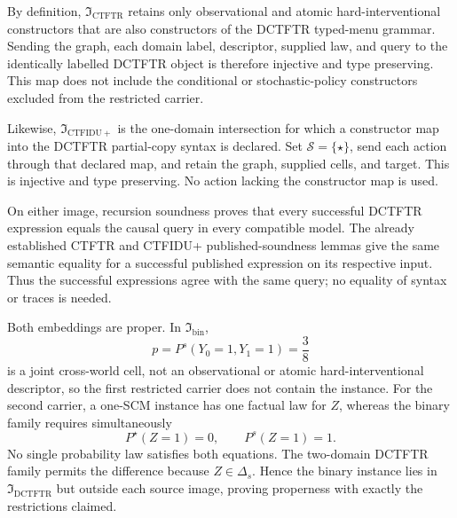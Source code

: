 By definition, \(\mathfrak I_{\mathrm{CTFTR}}\) retains only observational and atomic hard-interventional constructors that are also constructors of the DCTFTR typed-menu grammar. Sending the graph, each domain label, descriptor, supplied law, and query to the identically labelled DCTFTR object is therefore injective and type preserving. This map does not include the conditional or stochastic-policy constructors excluded from the restricted carrier.

Likewise, \(\mathfrak I_{\mathrm{CTFIDU+}}\) is the one-domain intersection for which a constructor map into the DCTFTR partial-copy syntax is declared. Set \(\mathcal S=\{\star\}\), send each action through that declared map, and retain the graph, supplied cells, and target. This is injective and type preserving. No action lacking the constructor map is used.

On either image, recursion soundness proves that every successful DCTFTR expression equals the causal query in every compatible model. The already established CTFTR and CTFIDU+ published-soundness lemmas give the same semantic equality for a successful published expression on its respective input. Thus the successful expressions agree with the same query; no equality of syntax or traces is needed.

Both embeddings are proper. In \(\mathfrak I_{\mathrm{bin}}\),
\[
p=P^s(Y_0=1,Y_1=1)=\frac38
\]
is a joint cross-world cell, not an observational or atomic hard-interventional descriptor, so the first restricted carrier does not contain the instance. For the second carrier, a one-SCM instance has one factual law for \(Z\), whereas the binary family requires simultaneously
\[
P^\star(Z=1)=0,
\qquad P^s(Z=1)=1.
\]
No single probability law satisfies both equations. The two-domain DCTFTR family permits the difference because \(Z\in\Delta_s\). Hence the binary instance lies in \(\mathfrak I_{\mathrm{DCTFTR}}\) but outside each source image, proving properness with exactly the restrictions claimed.